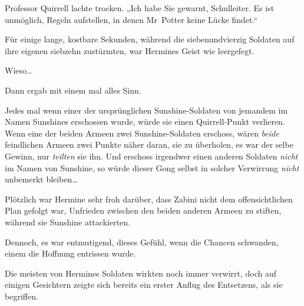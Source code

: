 Professor Quirrell lachte trocken. „Ich habe Sie gewarnt, Schulleiter. Es ist unmöglich, Regeln aufstellen, in denen Mr~Potter keine Lücke findet.“

\later

Für einige lange, kostbare Sekunden, während die siebenundvierzig Soldaten auf ihre eigenen siebzehn zustürmten, war Hermines Geist wie leergefegt.

Wieso…

Dann ergab mit einem mal alles Sinn.

Jedes mal wenn einer der ursprünglichen Sunshine-Soldaten von jemandem im Namen Sunshines erschossen wurde, würde sie einen Quirrell-Punkt verlieren. Wenn eine der beiden Armeen zwei Sunshine-Soldaten erschoss, wären \emph{beide} feindlichen Armeen zwei Punkte näher daran, sie zu überholen, es war der selbe Gewinn, nur \emph{teilten} sie ihn. Und erschoss irgendwer einen anderen Soldaten \emph{nicht} im Namen von Sunshine, so würde dieser Gong selbst in solcher Verwirrung \emph{nicht} unbemerkt bleiben…

Plötzlich war Hermine sehr froh darüber, dass Zabini nicht dem offensichtlichen Plan gefolgt war, Unfrieden zwischen den beiden anderen Armeen zu stiften, während sie Sunshine attackierten.

Dennoch, es war entmutigend, dieses Gefühl, wenn die Chancen schwanden, einem die Hoffnung entrissen wurde.

Die meisten von Hermines Soldaten wirkten noch immer verwirrt, doch auf einigen Gesichtern zeigte sich bereits ein erster Anflug des Entsetzens, als sie begriffen.

